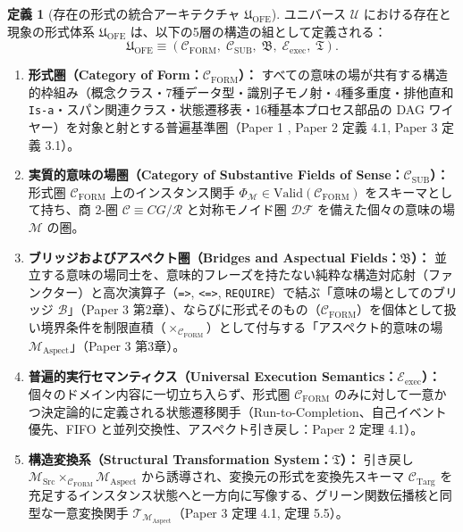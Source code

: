 \documentclass[11pt,a4paper]{ltjsarticle}
\theoremstyle{definition}
\newtheorem{definition}{定義}[section]
\theoremstyle{plain}
\begin{document}
\begin{definition}[存在の形式の統合アーキテクチャ $\mathfrak{U}_{\mathrm{OFE}}$]
ユニバース $\mathcal{U}$ における存在と現象の形式体系 $\mathfrak{U}_{\mathrm{OFE}}$ は、以下の5層の構造の組として定義される：
\[
\mathfrak{U}_{\mathrm{OFE}} \equiv \left(\mathcal{C}_{\mathrm{FORM}},\; \mathcal{C}_{\mathrm{SUB}},\; \mathfrak{B},\; \mathcal{E}_{\mathrm{exec}},\; \mathfrak{T}\right).
\]
\begin{enumerate}
    \item \textbf{形式圏（Category of Form：$\mathcal{C}_{\mathrm{FORM}}$）：} すべての意味の場が共有する構造的枠組み（概念クラス・7種データ型・識別子モノ射・4種多重度・排他直和 \texttt{Is-a}・スパン関連クラス・状態遷移表・16種基本プロセス部品の DAG ワイヤー）を対象と射とする普遍基準圏（Paper 1 \cite{Ota2026_1}, Paper 2 \cite{Ota2026_2} 定義 4.1, Paper 3 \cite{Ota2026_3} 定義 3.1）。
    \item \textbf{実質的意味の場圏（Category of Substantive Fields of Sense：$\mathcal{C}_{\mathrm{SUB}}$）：} 形式圏 $\mathcal{C}_{\mathrm{FORM}}$ 上のインスタンス関手 $\Phi_{\mathcal{M}} \in \mathrm{Valid}(\mathcal{C}_{\mathrm{FORM}})$ をスキーマとして持ち、商 2-圏 $\mathcal{C} \equiv CG/\mathcal{R}$ と対称モノイド圏 $\mathcal{DF}$ を備えた個々の意味の場 $\mathcal{M}$ の圏。
    \item \textbf{ブリッジおよびアスペクト圏（Bridges and Aspectual Fields：$\mathfrak{B}$）：} 並立する意味の場同士を、意味的フレーズを持たない純粋な構造対応射（ファンクター）と高次演算子（\texttt{=>}, \texttt{<=>}, \texttt{REQUIRE}）で結ぶ「意味の場としてのブリッジ $\mathcal{B}$」（Paper 3 \cite{Ota2026_3} 第2章）、ならびに形式そのもの（$\mathcal{C}_{\mathrm{FORM}}$）を個体として扱い境界条件を制限直積（$\times_{\mathcal{C}_{\mathrm{FORM}}}$）として付与する「アスペクト的意味の場 $\mathcal{M}_{\mathrm{Aspect}}$」（Paper 3 \cite{Ota2026_3} 第3章）。
    \item \textbf{普遍的実行セマンティクス（Universal Execution Semantics：$\mathcal{E}_{\mathrm{exec}}$）：} 個々のドメイン内容に一切立ち入らず、形式圏 $\mathcal{C}_{\mathrm{FORM}}$ のみに対して一意かつ決定論的に定義される状態遷移関手（Run-to-Completion、自己イベント優先、FIFO と並列交換性、アスペクト引き戻し：Paper 2 \cite{Ota2026_2} 定理 4.1）。
    \item \textbf{構造変換系（Structural Transformation System：$\mathfrak{T}$）：} 引き戻し $\mathcal{M}_{\mathrm{Src}} \times_{\mathcal{C}_{\mathrm{FORM}}} \mathcal{M}_{\mathrm{Aspect}}$ から誘導され、変換元の形式を変換先スキーマ $\mathcal{C}_{\mathrm{Targ}}$ を充足するインスタンス状態へと一方向に写像する、グリーン関数伝播核と同型な一意変換関手 $\mathcal{T}_{\mathcal{M}_{\mathrm{Aspect}}}$（Paper 3 \cite{Ota2026_3} 定理 4.1, 定理 5.5）。
\end{enumerate}
\end{definition}
\end{document}
